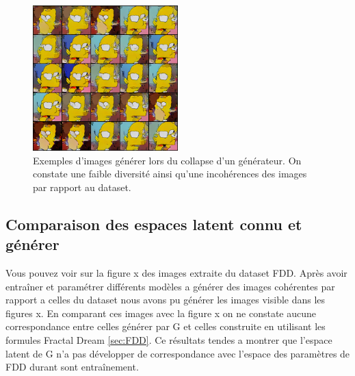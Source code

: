 \documentclass[11pt,francais]{article}
\begin{document}
\begin{figure}[t]
    \centering
    \includegraphics[width=0.5\textwidth]{Figures/LossG_et_Convergeance/collapse_980.png}
    \caption{Exemples d'images générer lors du collapse d'un générateur. On constate une faible diversité ainsi qu'une incohérences des images par rapport au dataset.}
    \label{fig:fig7}
\end{figure}

\subsection{Comparaison des espaces latent connu et générer}
\label{sec:ComparaisonLS}
Vous pouvez voir sur la figure x des images extraite du dataset FDD.
Après avoir entraîner et paramétrer différents modèles a générer des images cohérentes par rapport a celles du dataset nous avons pu générer les images visible dans les figures x. 
En comparant ces images avec la figure x on ne constate aucune correspondance entre celles générer par G et celles construite en utilisant les formules Fractal Dream \ref{sec:FDD}.
Ce résultats tendes a montrer que l'espace latent de G n'a pas développer de correspondance avec l'espace des paramètres de FDD durant sont entraînement. 
\end{document}
